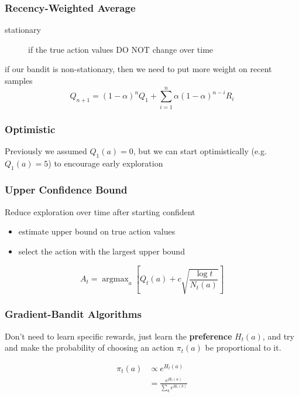 \documentclass[]{article}
\theoremstyle{definition}
\DeclareMathOperator*{\argmax}{argmax}
\begin{document}
\subsubsection{Recency-Weighted Average}
\label{ssub:recency_weighted_average}

\begin{description}
    \item[stationary] if the true action values DO NOT change over time
\end{description}

if our bandit is non-stationary, then we need to put more weight on recent samples 
\begin{equation*}
    Q_{n+1} = (1 - \alpha)^n Q_1 + \sum_{i=1}^n \alpha(1 - \alpha)^{n - i} R_i
\end{equation*}

\subsubsection{Optimistic}
\label{ssub:optimistic}
Previously we assumed $Q_1(a) = 0$, but we can start optimistically (e.g. $Q_1(a) = 5$) to encourage early exploration

\subsubsection{Upper Confidence Bound}
\label{ssub:upper_confidence_bound}
Reduce exploration over time after starting confident
\begin{itemize}
    \item estimate upper bound on true action values
    \item select the action with the largest upper bound
\end{itemize}

\begin{equation*}
    A_t = \argmax_a [Q_t(a) + c \sqrt{\frac{\log t}{N_t(a)}}]
\end{equation*}

\subsubsection{Gradient-Bandit Algorithms}
\label{ssub:gradient_bandit_algorithms}

Don't need to learn specific rewards, just learn the \textbf{preference} $H_t(a)$, and try and make the probability of choosing an action $\pi_t(a)$ be proportional to it.

\begin{eqnarray*}
    \pi_t(a) &\propto e^{H_t(a)} \\
             &= \frac{e^{H_t(a)}}{\sum_b e^{H_t(b)}}
\end{eqnarray*}
\end{document}
